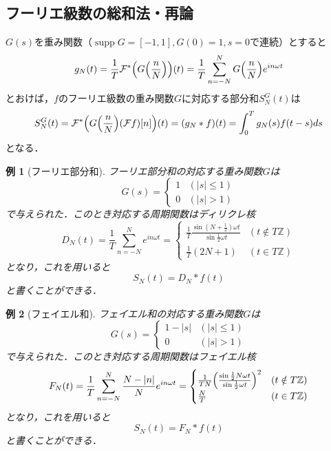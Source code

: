 \documentclass[dvipdfmx,a4j,10pt]{jsarticle}
\theoremstyle{mystyle1}
\theoremstyle{mystyle3}
\newtheorem{example}{例}[section]
\theoremstyle{mystyle4}
\theoremstyle{mystyle6}
\theoremstyle{mystyle2}
\theoremstyle{mystyle5}
\newenvironment{ex}[1][]
{\begin{tcolorbox}[
    enhanced,
    boxrule=0pt,
    arc=0mm,
    frame hidden,
    borderline west={0.25pt}{-4pt}{black},
    borderline west={0.25pt}{-2.25pt}{black},
    breakable = true
    ]
    \begin{example}[#1]
}
{\end{example}\end{tcolorbox}}
\DeclareMathOperator{\supp}{supp}
\begin{document}
\subsection{フーリエ級数の総和法・再論}\label{sec:2-5}

$G(s)$を重み関数（$\supp G=[-1,1],G(0)=1,s=0$で連続）とすると
\[
	g_N(t)=\frac{1}{T}\mathcal{F}^*\mleft(G\mleft(\frac{n}{N}\mright)\mright)(t)=\frac{1}{T}\sum_{n=-N}^NG\mleft(\frac{n}{N}\mright)e^{in\omega t}
\]
とおけば，$f$のフーリエ級数の重み関数$G$に対応する部分和$S_N^G(t)$は
\[
	S_N^G(t)=\mathcal{F}^*\mleft(G\mleft(\frac{n}{N}\mright)(\mathcal{F}f)[n]\mright)(t)=(g_N*f)(t)=\int_0^T g_N(s)f(t-s)ds
\]
となる．

\setcounter{example}{6}

\begin{ex}[フーリエ部分和]\label{ex:2-7}
	フーリエ部分和の対応する重み関数$G$は
	\[
		G(s)=\begin{cases}
			1 & (|s|\leq 1) \\
			0 & (|s|>1)
		\end{cases}
	\]
	で与えられた．このとき対応する周期関数はディリクレ核
	\[
		D_N(t)=\frac{1}{T}\sum_{n=-N}^N e^{in\omega t}=\begin{cases}
			\frac{1}{T}\frac{\sin(N+\frac{1}{2})\omega t}{\sin\frac{1}{2}\omega t} & (t\notin T\mathbb{Z}) \\
			\frac{1}{T}(2N+1)                                                      & (t\in T\mathbb{Z})
		\end{cases}
	\]
	となり，これを用いると
	\[
		S_N(t)=D_N*f(t)
	\]
	と書くことができる．
\end{ex}

\begin{ex}[フェイエル和]\label{ex:2-8}
	フェイエル和の対応する重み関数$G$は
	\[
		G(s)=\begin{cases}
			1-|s| & (|s|\leq 1) \\
			0     & (|s|>1)
		\end{cases}
	\]
	で与えられた．このとき対応する周期関数はフェイエル核
	\[
		F_N(t)=\frac{1}{T}\sum_{n=-N}^N \frac{N-|n|}{N}e^{in\omega t}=\begin{cases}
			\frac{1}{TN}\mleft(\frac{\sin\frac{1}{2}N\omega t}{\sin\frac{1}{2}\omega t}\mright)^2 & (t\notin T\mathbb{Z}) \\
			\frac{N}{T}                                                                           & (t\in T\mathbb{Z})
		\end{cases}
	\]
	となり，これを用いると
	\[
		S_N(t)=F_N*f(t)
	\]
	と書くことができる．
\end{ex}
\end{document}
